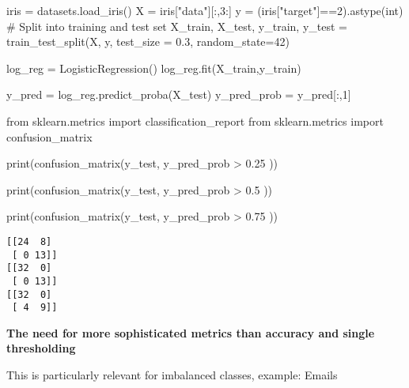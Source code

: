 \documentclass[
  letterpaper,
  DIV=11,
  numbers=noendperiod]{scrreprt}
\newenvironment{Shaded}{\begin{snugshade}}{\end{snugshade}}
\newcommand{\BuiltInTok}[1]{\textcolor[rgb]{0.00,0.23,0.31}{#1}}
\newcommand{\CommentTok}[1]{\textcolor[rgb]{0.37,0.37,0.37}{#1}}
\newcommand{\DecValTok}[1]{\textcolor[rgb]{0.68,0.00,0.00}{#1}}
\newcommand{\FloatTok}[1]{\textcolor[rgb]{0.68,0.00,0.00}{#1}}
\newcommand{\ImportTok}[1]{\textcolor[rgb]{0.00,0.46,0.62}{#1}}
\newcommand{\NormalTok}[1]{\textcolor[rgb]{0.00,0.23,0.31}{#1}}
\newcommand{\OperatorTok}[1]{\textcolor[rgb]{0.37,0.37,0.37}{#1}}
\newcommand{\StringTok}[1]{\textcolor[rgb]{0.13,0.47,0.30}{#1}}
\begin{document}
\begin{Shaded}
\begin{Highlighting}[]
\NormalTok{iris }\OperatorTok{=}\NormalTok{ datasets.load\_iris()}
\NormalTok{X }\OperatorTok{=}\NormalTok{ iris[}\StringTok{"data"}\NormalTok{][:,}\DecValTok{3}\NormalTok{:]}
\NormalTok{y }\OperatorTok{=}\NormalTok{ (iris[}\StringTok{"target"}\NormalTok{]}\OperatorTok{==}\DecValTok{2}\NormalTok{).astype(}\BuiltInTok{int}\NormalTok{)}
\CommentTok{\# Split into training and test set}
\NormalTok{X\_train, X\_test, y\_train, y\_test }\OperatorTok{=}\NormalTok{ train\_test\_split(X, y, test\_size }\OperatorTok{=} \FloatTok{0.3}\NormalTok{, random\_state}\OperatorTok{=}\DecValTok{42}\NormalTok{)}

\NormalTok{log\_reg }\OperatorTok{=}\NormalTok{ LogisticRegression()}
\NormalTok{log\_reg.fit(X\_train,y\_train)}

\NormalTok{y\_pred }\OperatorTok{=}\NormalTok{ log\_reg.predict\_proba(X\_test) }
\NormalTok{y\_pred\_prob }\OperatorTok{=}\NormalTok{ y\_pred[:,}\DecValTok{1}\NormalTok{]}

\ImportTok{from}\NormalTok{ sklearn.metrics }\ImportTok{import}\NormalTok{ classification\_report}
\ImportTok{from}\NormalTok{ sklearn.metrics }\ImportTok{import}\NormalTok{ confusion\_matrix}

\BuiltInTok{print}\NormalTok{(confusion\_matrix(y\_test, y\_pred\_prob }\OperatorTok{\textgreater{}} \FloatTok{0.25}\NormalTok{ ))}

\BuiltInTok{print}\NormalTok{(confusion\_matrix(y\_test, y\_pred\_prob }\OperatorTok{\textgreater{}} \FloatTok{0.5}\NormalTok{ ))}

\BuiltInTok{print}\NormalTok{(confusion\_matrix(y\_test, y\_pred\_prob }\OperatorTok{\textgreater{}} \FloatTok{0.75}\NormalTok{ ))}
\end{Highlighting}
\end{Shaded}

\begin{verbatim}
[[24  8]
 [ 0 13]]
[[32  0]
 [ 0 13]]
[[32  0]
 [ 4  9]]
\end{verbatim}

\textbf{The need for more sophisticated metrics than accuracy and single
thresholding}

This is particularly relevant for imbalanced classes, example: Emails
\end{document}
